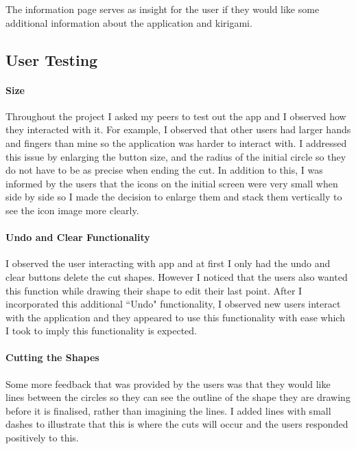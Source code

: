 \documentclass[11pt]{article}
\begin{document}
                    The information page serves as insight for the user if they would like some additional information about the application and kirigami.
               
               \subsection{User Testing}
    
           \paragraph{Size}
           Throughout the project I asked my peers to test out the app and I observed how they interacted with it. For example, I observed that other users had larger hands and fingers than mine so the application was harder to interact with. I addressed this issue by enlarging the button size, and the radius of the initial circle so they do not have to be as precise when ending the cut. In addition to this, I was informed by the users that the icons on the initial screen were very small when side by side so I made the decision to enlarge them and stack them vertically to see the icon image more clearly. 
           
           \paragraph{Undo and Clear Functionality}
           I observed the user interacting with app and at first I only had the undo and clear buttons delete the cut shapes. However I noticed that the users also wanted this function while drawing their shape to edit their last point. After I incorporated this additional ``Undo" functionality, I observed new users interact with the application and they appeared to use this functionality with ease which I took to imply this functionality is expected. 
           
           \paragraph{Cutting the Shapes}
           Some more feedback that was provided by the users was that they would like lines between the circles so they can see the outline of the shape they are drawing before it is finalised, rather than imagining the lines. I added lines with small dashes to illustrate that this is where the cuts will occur and the users responded positively to this. 
           
\end{document}
